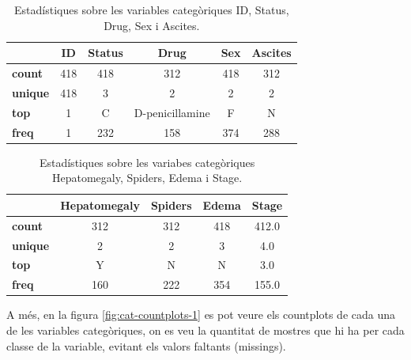 \begin{table}[H]
\centering
\begin{tabular}{|l|c|c|c|c|c|}
\hline
\textbf{} & \textbf{ID} & \textbf{Status} & \textbf{Drug} & \textbf{Sex} & \textbf{Ascites} \\ \hline
\textbf{count}     & 418         & 418             & 312            & 418           & 312              \\ \hline
\textbf{unique}    & 418         & 3               & 2              & 2             & 2                \\ \hline
\textbf{top}       & 1           & C               & D-penicillamine & F             & N                \\ \hline
\textbf{freq}      & 1           & 232             & 158            & 374           & 288              \\ \hline
\end{tabular}
\caption{Estadístiques sobre les variables categòriques ID, Status, Drug, Sex i Ascites.}
\label{tab:cat-stats-1}
\end{table}

\begin{table}[H]
\centering
\begin{tabular}{|l|c|c|c|c|}
\hline
\textbf{} & \textbf{Hepatomegaly} & \textbf{Spiders} & \textbf{Edema} & \textbf{Stage} \\ \hline
\textbf{count}     & 312                    & 312              & 418             & 412.0          \\ \hline
\textbf{unique}    & 2                      & 2                & 3               & 4.0            \\ \hline
\textbf{top}       & Y                      & N                & N               & 3.0            \\ \hline
\textbf{freq}      & 160                    & 222              & 354             & 155.0          \\ \hline
\end{tabular}
\caption{Estadístiques sobre les variabes categòriques Hepatomegaly, Spiders, Edema i Stage.}
\label{tab:cat-stats-2}
\end{table}

A més, en la figura \ref{fig:cat-countplots-1} es pot veure els countplots de cada una de les variables categòriques, on es veu la quantitat de mostres que hi ha per cada classe de la variable, evitant els valors faltants (missings).

